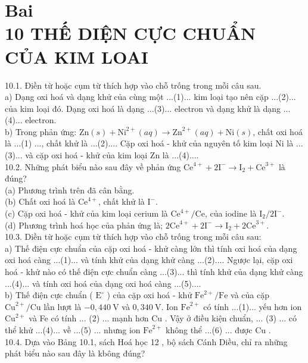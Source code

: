 \documentclass[10pt]{article}
\begin{document}
\section*{Bai \\
 10 THẾ DIỆN CỰC CHUẨN CỦA KIM LOAI}
10.1. Điền từ hoặc cụm từ thích hợp vào chỗ trống trong mỗi câu sau.\\
a) Dạng oxi hoá và dạng khử của cùng một ...(1)... kim loại tạo nên cặp ...(2)... của kim loại đó. Dạng oxi hoá là dạng ...(3)... electron và dạng khử là dạng ...(4)... electron.\\
b) Trong phản ứng: $\mathrm{Zn}(s)+\mathrm{Ni}^{2+}(a q) \rightarrow \mathrm{Zn}^{2+}(a q)+\mathrm{Ni}(s)$, chất oxi hoá là ...(1) ..., chất khử là ...(2).... Cặp oxi hoá - khử của nguyên tố kim loại Ni là ...(3)... và cặp oxi hoá - khử của kim loại Zn là ...(4)....\\
10.2. Những phát biểu nào sau đây về phản ứng $\mathrm{Ce}^{4+}+2 \mathrm{I}^{-} \rightarrow \mathrm{I}_{2}+\mathrm{Ce}^{3+}$ là đúng?\\
(a) Phương trình trên đã cân bằng.\\
(b) Chất oxi hoá là $\mathrm{Ce}^{4+}$, chất khử là $\mathrm{I}^{-}$.\\
(c) Cặp oxi hoá - khử của kim loại cerium là $\mathrm{Ce}^{4+} / \mathrm{Ce}$, của iodine là $\mathrm{I}_{2} / 2 \mathrm{I}^{-}$.\\
(d) Phương trình hoá học của phản ứng là; $2 \mathrm{Ce}^{4+}+2 \mathrm{I}^{-} \rightarrow \mathrm{I}_{2}+2 \mathrm{Ce}^{3+}$.\\
10.3. Diền từ hoặc cụm từ thích hợp vào chỗ trống trong mỗi câu sau:\\
a) Thế điện cực chuẩn của cặp oxi hoá - khử càng lớn thì tính oxi hoá của dạng oxi hoá càng ...(1)... và tính khử của dạng khử càng ...(2).... Ngược lại, cặp oxi hoá - khử nào có thế điện cực chuẩn càng ...(3)... thì tính khử của dạng khử càng ...(4)... và tính oxi hoá của dạng oxi hoá càng ...(5)....\\
b) Thế điện cực chuẩn ( $\mathrm{E}^{\circ}$ ) của cặp oxi hoá - khử $\mathrm{Fe}^{2+} / \mathrm{Fe}$ và của cặp $\mathrm{Cu}^{2+} / \mathrm{Cu}$ lần lượt là $-0,440 \mathrm{~V}$ và $0,340 \mathrm{~V}$. Ion $\mathrm{Fe}^{2+}$ có tính ...(1)... yếu hơn ion $\mathrm{Cu}^{2+}$ và Fe có tính ... (2) ... mạnh hơn Cu . Vậy ở điều kiện chuẩn, ... (3) ... có thể khử ...(4)... về ...(5) ... nhưng ion $\mathrm{Fe}^{2+}$ không thể ...(6) ... được Cu .\\
10.4. Dựa vào Bảng 10.1, sách Hoá học 12 , bộ sách Cánh Diều, chỉ ra những phát biểu nào sau đây là kbông đúng?\\
\end{document}
